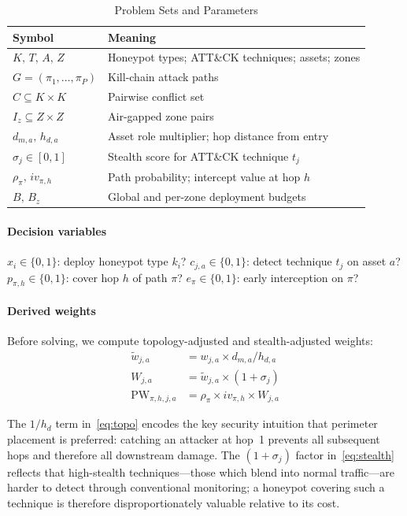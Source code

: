 \documentclass[journal]{IEEEtran}
\begin{document}
\begin{table}[!htb]
\caption{Problem Sets and Parameters}
\label{tab:symbols}
\centering
\renewcommand{\arraystretch}{1.2}
\begin{tabular}{ll}
\toprule
Symbol & Meaning \\
\midrule
$K,\,T,\,A,\,Z$ & Honeypot types; ATT\&CK techniques; assets; zones \\
$G=(\pi_1,\dots,\pi_P)$ & Kill-chain attack paths \\
$C\subseteq K\times K$ & Pairwise conflict set \\
$I_z\subseteq Z\times Z$ & Air-gapped zone pairs \\
$d_{m,a},\,h_{d,a}$ & Asset role multiplier; hop distance from entry \\
$\sigma_j\in[0,1]$ & Stealth score for ATT\&CK technique $t_j$ \\
$\rho_\pi,\,iv_{\pi,h}$ & Path probability; intercept value at hop $h$ \\
$B,\,B_z$ & Global and per-zone deployment budgets \\
\bottomrule
\end{tabular}
\end{table}

\paragraph{Decision variables}
$x_i\in\{0,1\}$: deploy honeypot type $k_i$?
$c_{j,a}\in\{0,1\}$: detect technique $t_j$ on asset $a$?
$p_{\pi,h}\in\{0,1\}$: cover hop $h$ of path $\pi$?
$e_\pi\in\{0,1\}$: early interception on $\pi$?

\paragraph{Derived weights}
Before solving, we compute topology-adjusted and stealth-adjusted
weights:
\begin{align}
  \tilde{w}_{j,a} &= w_{j,a}\times d_{m,a}/h_{d,a}
  \label{eq:topo}\\
  W_{j,a} &= \tilde{w}_{j,a}\times(1+\sigma_j)
  \label{eq:stealth}\\
  \mathrm{PW}_{\pi,h,j,a} &= \rho_\pi\times iv_{\pi,h}\times W_{j,a}
  \label{eq:pathweight}
\end{align}

The $1/h_d$ term in~\eqref{eq:topo} encodes the key security
intuition that perimeter placement is preferred: catching an attacker
at hop~1 prevents all subsequent hops and therefore all downstream
damage. The $(1+\sigma_j)$ factor in~\eqref{eq:stealth} reflects
that high-stealth techniques---those which blend into normal
traffic---are harder to detect through conventional monitoring; a
honeypot covering such a technique is therefore disproportionately
valuable relative to its cost.
\end{document}
